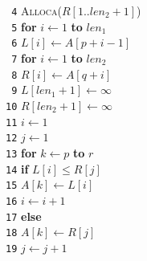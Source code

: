 \documentclass[10pt,landscape]{article}
\begin{document}
\begin{multicols*}{4}
\begin{multicols}{2}
                        \verb| 4|\hspace*{0.5em} \textsc{Alloca}($R[1..len_2 + 1]$)\\
                        \verb| 5|\hspace*{0.5em} \textbf{for} $i \leftarrow 1$ \textbf{to} $len_1$\\
                        \verb| 6|\hspace*{1.5em} $L[i] \leftarrow A[p + i - 1]$\\
                        \verb| 7|\hspace*{0.5em} \textbf{for} $i \leftarrow 1$ \textbf{to} $len_2$\\
                        \verb| 8|\hspace*{1.5em} $R[i] \leftarrow A[q + i]$\\
                        \verb| 9|\hspace*{0.5em} $L[len_1 + 1] \leftarrow \infty$\\
                        \verb|10|\hspace*{0.5em} $R[len_2 + 1] \leftarrow \infty$\\
                        \verb|11|\hspace*{0.5em} $i \leftarrow 1$\\
                        \verb|12|\hspace*{0.5em} $j \leftarrow 1$\\
                        \verb|13|\hspace*{0.5em} \textbf{for} $k \leftarrow p$ \textbf{to} $r$\\
                        \verb|14|\hspace*{1.5em} \textbf{if} $L[i] \le R[j]$\\
                        \verb|15|\hspace*{2.5em} $A[k] \leftarrow L[i]$\\
                        \verb|16|\hspace*{2.5em} $i \leftarrow i + 1$\\
                        \verb|17|\hspace*{1.5em} \textbf{else}\\
                        \verb|18|\hspace*{2.5em} $A[k] \leftarrow R[j]$\\
                        \verb|19|\hspace*{2.5em} $j \leftarrow j + 1$\\
                \end{multicols}

\end{multicols*}
\end{document}

